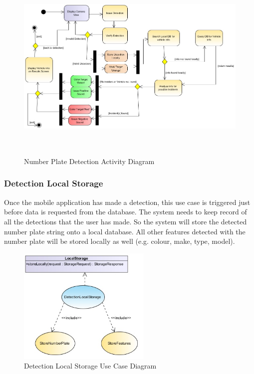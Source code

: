\documentclass[12pt]{article}
\begin{document}
                    				\begin{figure}[h]
					           				\centering
					           				\includegraphics[width=6.25in, height=3.67in]{Pictures/NumberPlateDetectionActivity.jpg}
					           				\caption{Number Plate Detection Activity Diagram}
		           					\end{figure}
		                  				\FloatBarrier
                    				
                    		\subsubsection{Detection Local Storage}
                    				Once the mobile application has made a detection, this use case is triggered just before data is requested from the database. The system needs to keep record of all the detections that the user has made. So the system will store the detected number plate string onto a local database. All other features detected with the number plate will be stored locally as well (e.g. colour, make, type, model).
                    				\begin{figure}[h]
					           				\centering
					           				\includegraphics[width=2.5in, height=2.21in]{Pictures/DetectionLocalStorageUseCase.jpg}
					           				\caption{Detection Local Storage Use Case Diagram}
		           					\end{figure}
                    				\FloatBarrier
\end{document}
